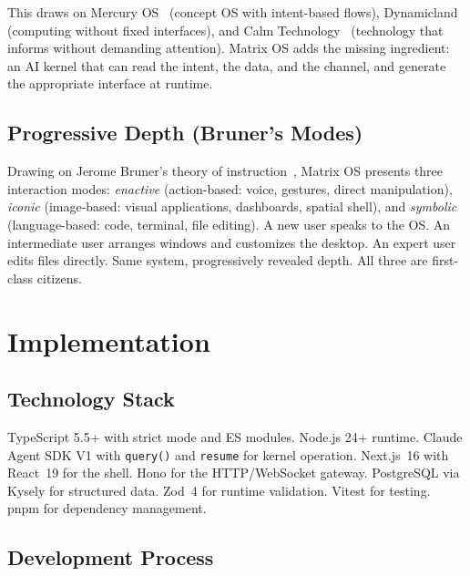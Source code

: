 \documentclass[11pt,a4paper]{article}
\begin{document}
This draws on Mercury OS~\cite{yuan2019mercury} (concept OS with intent-based flows), Dynamicland~\cite{dynamicland2018} (computing without fixed interfaces), and Calm Technology~\cite{case2015calm} (technology that informs without demanding attention). Matrix OS adds the missing ingredient: an AI kernel that can read the intent, the data, and the channel, and generate the appropriate interface at runtime.

\subsection{Progressive Depth (Bruner's Modes)}

Drawing on Jerome Bruner's theory of instruction~\cite{bruner1966instruction}, Matrix OS presents three interaction modes: \emph{enactive} (action-based: voice, gestures, direct manipulation), \emph{iconic} (image-based: visual applications, dashboards, spatial shell), and \emph{symbolic} (language-based: code, terminal, file editing). A new user speaks to the OS. An intermediate user arranges windows and customizes the desktop. An expert user edits files directly. Same system, progressively revealed depth. All three are first-class citizens.

\section{Implementation}

\subsection{Technology Stack}

TypeScript 5.5+ with strict mode and ES modules. Node.js 24+ runtime. Claude Agent SDK V1 with \texttt{query()} and \texttt{resume} for kernel operation. Next.js~16 with React~19 for the shell. Hono for the HTTP/WebSocket gateway. PostgreSQL via Kysely for structured data. Zod~4 for runtime validation. Vitest for testing. pnpm for dependency management.

\subsection{Development Process}
\end{document}
